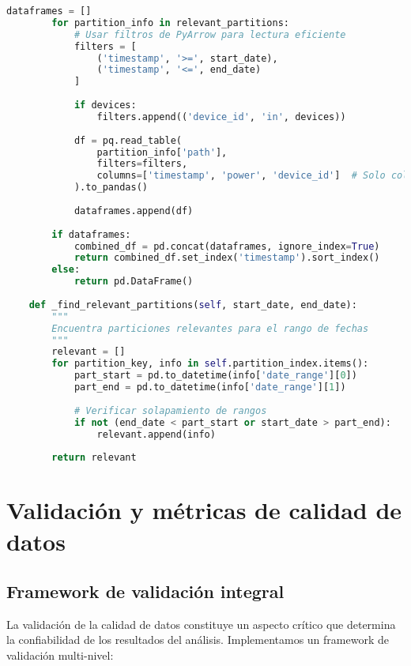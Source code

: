 \begin{lstlisting}[language=Python, caption=Sistema de particionamiento temporal]
        dataframes = []
        for partition_info in relevant_partitions:
            # Usar filtros de PyArrow para lectura eficiente
            filters = [
                ('timestamp', '>=', start_date),
                ('timestamp', '<=', end_date)
            ]
            
            if devices:
                filters.append(('device_id', 'in', devices))
            
            df = pq.read_table(
                partition_info['path'],
                filters=filters,
                columns=['timestamp', 'power', 'device_id']  # Solo columnas necesarias
            ).to_pandas()
            
            dataframes.append(df)
        
        if dataframes:
            combined_df = pd.concat(dataframes, ignore_index=True)
            return combined_df.set_index('timestamp').sort_index()
        else:
            return pd.DataFrame()
    
    def _find_relevant_partitions(self, start_date, end_date):
        """
        Encuentra particiones relevantes para el rango de fechas
        """
        relevant = []
        for partition_key, info in self.partition_index.items():
            part_start = pd.to_datetime(info['date_range'][0])
            part_end = pd.to_datetime(info['date_range'][1])
            
            # Verificar solapamiento de rangos
            if not (end_date < part_start or start_date > part_end):
                relevant.append(info)
        
        return relevant
\end{lstlisting}

\section{Validación y métricas de calidad de datos}

\subsection{Framework de validación integral}

La validación de la calidad de datos constituye un aspecto crítico que determina la confiabilidad de los resultados del análisis. Implementamos un framework de validación multi-nivel:

